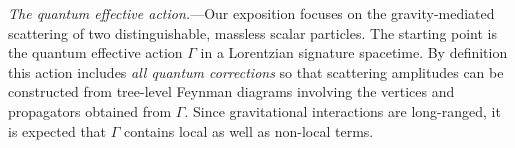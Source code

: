 \documentclass[aps,prl,onecolumn,superscriptaddress,longbibliography,nofootinbib,floatfix,showpacs,12pt]{revtex4-1}
\begin{document}
\textit{The quantum effective action.}---Our exposition focuses on the gravity-mediated scattering of two distinguishable, massless scalar particles.
The starting point is the quantum effective action $\Gamma$ in a Lorentzian signature spacetime.
By definition this action includes \emph{all quantum corrections} so that scattering amplitudes can be constructed from tree-level Feynman diagrams involving the vertices and propagators obtained from $\Gamma$.
Since gravitational interactions are long-ranged, it is expected that $\Gamma$ contains local as well as non-local terms.
\end{document}
